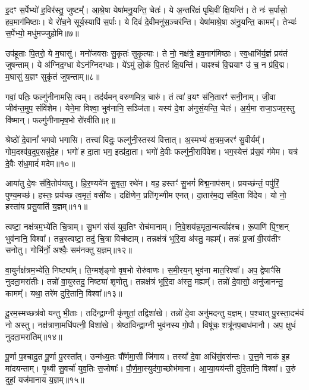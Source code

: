 इ॒दꣳ स॒र्पेभ्यो॑ ह॒विर॑स्तु॒ जुष्टम्᳚। 
आ॒श्रे॒षा येषा॑मनु॒यन्ति॒ चेतः॑। 
ये अ॒न्तरि॑क्षं पृथि॒वीं क्षि॒यन्ति॑। 
ते नः॑ स॒र्पासो॒ हव॒माग॑मिष्ठाः। 
ये रो॑च॒ने सूर्य॒स्यापि॑ स॒र्पाः। 
ये दिवं॑ दे॒वीमनु॑स॒ञ्चर॑न्ति। 
येषा॑माश्रे॒षा अ॑नु॒यन्ति॒ कामम्᳚। 
तेभ्यः॑ स॒र्पेभ्यो॒ मधु॑मज्जुहोमि॥७॥ 

उप॑हूताः पि॒तरो॒ ये म॒घासु॑। 
मनो॑जवसः सु॒कृतः॑ सुकृ॒त्याः। 
ते नो॒ नक्ष॑त्रे॒ हव॒माग॑मिष्ठाः। 
स्व॒धाभि॑र्य॒ज्ञं प्रय॑तं जुषन्ताम्। 
ये अ॑ग्निद॒ग्धा येऽन॑ग्निदग्धाः। 
ये॑ऽमुं लो॒कं पि॒तरः॑ क्षि॒यन्ति॑। 
याꣴश्च॑ वि॒द्मयाꣳ उ॑ च॒ न प्र॑वि॒द्म। 
म॒घासु॑ य॒ज्ञꣳ सुकृ॑तं जुषन्ताम्॥८॥ 

गवां॒ पतिः॒ फल्गु॑नीनामसि॒ त्वम्। 
तद॑र्यमन् वरुणमित्र॒ चारु॑। 
तं त्वा॑ व॒यꣳ स॑नि॒तारꣳ॑ सनी॒नाम्। 
जी॒वा जीव॑न्त॒मुप॒ संवि॑शेम। 
येने॒मा विश्वा॒ भुव॑नानि॒ सञ्जि॑ता। 
यस्य॑ दे॒वा अ॑नुसं॒यन्ति॒ चेतः॑। 
अ॒र्य॒मा राजा॒ऽजर॒स्तु वि॑ष्मान्। 
फल्गु॑नीनामृष॒भो रो॑रवीति॥९॥ 

श्रेष्ठो॑ दे॒वानां᳚ भगवो भगासि। 
तत्त्वा॑ विदुः॒ फल्गु॑नी॒स्तस्य॑ वित्तात्। 
अ॒स्मभ्यं॑ क्ष॒त्रम॒जरꣳ॑ सु॒वीर्यम्᳚। 
गोम॒दश्व॑व॒दुप॒सन्नु॑\-दे॒ह। 
भगो॑ ह दा॒ता भग॒ इत्प्र॑दा॒ता। 
भगो॑ दे॒वीः फल्गु॑नी॒रावि॑वेश। 
भग॒स्येत्तं प्र॑स॒वं ग॑मेम। 
यत्र॑ दे॒वैः स॑ध॒मादं॑ मदेम॥१०॥ 

आया॑तु दे॒वः स॑वि॒तोप॑यातु। 
हि॒र॒ण्यये॑न सु॒वृता॒ रथे॑न। 
वह॒\an{} हस्तꣳ॑ सु॒भगं॑ विद्म॒नाप॑सम्। 
प्रयच्छ॑न्तं॒ पपु॑रिं॒ पुण्य॒मच्छ॑। 
हस्तः॒ प्रय॑च्छ त्व॒मृतं॒ वसी॑यः। 
दक्षि॑णेन॒ प्रति॑गृभ्णीम एनत्। 
दा॒तार॑म॒द्य स॑वि॒ता वि॑देय। 
यो नो॒ हस्ता॑य प्रसु॒वाति॑ य॒ज्ञम्॥११॥ 

त्वष्टा॒ नक्ष॑त्रम॒भ्ये॑ति चि॒त्राम्। 
सु॒भगं स॑सं युव॒तिꣳ रोच॑मानाम्। 
नि॒वे॒शय॑न्न॒\-मृता॒न्मर्त्याꣴ॑श्च। 
रू॒पाणि॑ पि॒ꣳ॒शन् भुव॑नानि॒ विश्वा᳚। 
तन्न॒स्त्वष्टा॒ तदु॑ चि॒त्रा विच॑ष्टाम्। 
तन्नक्ष॑त्रं भूरि॒दा अ॑स्तु॒ मह्यम्᳚। 
तन्नः॑ प्र॒जां वी॒रव॑तीꣳ सनोतु। 
गोभि॑र्नो॒ अश्वैः॒ सम॑नक्तु य॒ज्ञम्॥१२॥ 

वा॒युर्नक्ष॑त्रम॒भ्ये॑ति॒ निष्ट्या᳚म्। 
ति॒ग्मशृ॑ङ्गो वृष॒भो रोरु॑वाणः। 
स॒मी॒रय॒न् भुव॑ना मात॒रिश्वा᳚। 
अप॒ द्वेषाꣳ॑सि नुदता॒मरा॑तीः। 
तन्नो॑ वा॒युस्तदु॒ निष्ट्या॑ शृणोतु। 
तन्नक्ष॑त्रं भूरि॒दा अ॑स्तु॒ मह्यम्᳚। 
तन्नो॑ दे॒वासो॒ अनु॑जानन्तु॒ कामम्᳚। 
यथा॒ तरे॑म दुरि॒तानि॒ विश्वा᳚॥१३॥ 

दू॒रम॒स्मच्छत्र॑वो यन्तु भी॒ताः। 
तदि॑न्द्रा॒ग्नी कृ॑णुतां॒ तद्विशा॑खे। 
तन्नो॑ दे॒वा अनु॑मदन्तु य॒ज्ञम्। 
प॒श्चात् पु॒रस्ता॒दभ॑यं नो अस्तु। 
नक्ष॑त्राणा॒मधि॑पत्नी॒ विशा॑खे। 
श्रेष्ठा॑विन्द्रा॒ग्नी भुव॑नस्य गो॒पौ। 
विषू॑चः॒ शत्रू॑नप॒बाध॑मानौ। 
अप॒ क्षुधं॑ नुदता॒मरा॑तिम्॥१४॥ 

पू॒र्णा प॒श्चादु॒त पू॒र्णा पु॒रस्ता᳚त्। 
उन्म॑ध्य॒तः पौ᳚र्णमा॒सी जि॑गाय। 
तस्यां᳚ दे॒वा अधि॑सं॒वस॑न्तः। 
उ॒त्त॒मे नाक॑ इ॒ह मा॑दयन्ताम्। 
पृ॒थ्वी सु॒वर्चा॑ युव॒तिः स॒जोषाः᳚। 
पौ॒र्ण॒मा॒स्युद॑गा॒च्छोभ॑माना। 
आ॒प्या॒यय॑न्ती दुरि॒तानि॒ विश्वा᳚। 
उ॒रुं दुहां॒ यज॑मानाय य॒ज्ञम्॥१५॥ 

